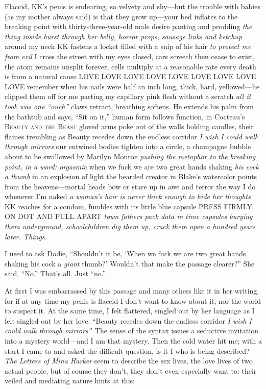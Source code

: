 \documentclass[
]{memoir}
\begin{document}
Flaccid, KK's penis is endearing, so velvety and shy---but the trouble
with babies (as my mother always said) is that they grow up---your bed
inflates to the breaking point with thirty-three-year-old male desire
panting and prodding \emph{the thing inside burst through her belly,
horror props, sausage links and ketchup} around my neck KK fastens a
locket filled with a snip of his hair \emph{to protect me from evil} I
cross the street with my eyes closed, cars screech then cease to exist,
the atom remains unsplit forever, cells multiply at a reasonable rate
every death is from a natural cause LOVE LOVE LOVE LOVE LOVE LOVE LOVE
LOVE LOVE remember when his nails were half an inch long, thick, hard,
yellowed---he clipped them off for me parting my capillary pink flesh
without a scratch \emph{all it took was one ``ouch''} claws retract,
breathing softens. He extends his palm from the bathtub and says, ``Sit
on it,'' human form follows function, in Cocteau's \textsc{Beauty and
the Beast} gloved arms poke out of the walls holding candles, their
flames trembling as Beauty recedes down the endless corridor \emph{I
wish I could walk through mirrors} our entwined bodies tighten into a
circle, a champagne bubble about to be swallowed by Marilyn Monroe
\emph{pushing the metaphor to the breaking point, in a word: orgasmic}
when we fuck we are two great hands shaking \emph{his cock a thumb} in
an explosion of light the bearded creator in Blake's watercolor points
from the heavens---mortal heads bow or stare up in awe and terror the
way I do whenever I'm naked \emph{a woman's hair is never thick enough
to hide her thoughts} KK reaches for a condom, fumbles with its little
blue capsule PRESS FIRMLY ON DOT AND PULL APART \emph{town fathers pack
data in time capsules burying them underground, schoolchildren dig them
up, crack them open a hundred years later. Things.}

I used to ask Dodie, ``Shouldn't it be, `When we fuck we are two great
hands shaking his cock a \emph{giant} thumb?' Wouldn't that make the
passage clearer?'' She said, ``No.'' That's all. Just ``no.''

At first I was embarrassed by this passage and many others like it in
her writing, for if at any time my penis is flaccid I don't want to know
about it, nor the world to suspect it. At the same time, I felt
flattered, singled out by her language as I felt singled out by her
love. ``Beauty recedes down the endless corridor \emph{I wish I could
walk through mirrors}.'' The sense of the syntax issues a seductive
invitation into a mystery world---and I am that mystery. Then the cold
water hit me; with a start I came to and asked the difficult question,
is it I who is being described? \emph{The Letters of Mina Harker} seem
to describe the sex lives, the love lives of two actual people, but of
course they don't, they don't even especially want to: their veiled and
mediating nature hints at this:
\end{document}
